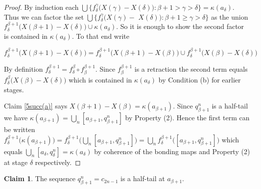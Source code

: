 \documentclass[12pt]{article}
\theoremstyle{plain}
\theoremstyle{definition}
\newcounter{claim5counter}
\newtheorem{claim5}[claim5counter]{Claim}
\newcommand{\K}{\ensuremath{\kappa}}
\newcommand{\B}{\ensuremath{\beta}}
\newcommand{\G}{\ensuremath{\gamma}}
\newcommand{\D}{\ensuremath{\delta}}
\newcommand{\0}{\ensuremath{\varnothing}}
\begin{document}
	\begin{proof}
		
		
		By induction each $\bigcup \big \{f^\G_\D  \big (X(\G) - X(\D) \big ): \B+1 > \G > \D \big \} = \K(a_\D)$.
		Thus we can factor the set $\bigcup \big \{f^\G_\D  \big (X(\G) - $ $X(\D) \big ): \B + 1 \ge \G > \D \big \}$ as the union $f^{\B+1}_\D  \big (X(\B+1) - X(\D) \big ) \cup \K(a_\D)$. So it is enough to show the second factor is contained in $ \K(a_\D) $. To that end write
		
		
		
		\begin{center}
			
			$f^{\B+1}_\D  \big (X(\B+1) - X(\D) \big ) = f^{\B+1}_\D  \big (X(\B+1) - X(\B) \big ) \cup f^{\B+1}_\D  \big (X(\B) - X(\D) \big )$	
			
		\end{center}
		
		By definition $f^{\B+1}_\D = f^\B_\D \circ f^{\B+1}_\B$. Since $f^{\B+1}_\B$ is a retraction the second term equals $f^{\B}_\D  \big (X(\B) - X(\D) \big )$ which is contained in $\K(a_\D)$ by Condition (b) for earlier stages.
		
		Claim \ref{5succ(a)} says $X(\B+1) - X(\B) = \K(a_{\B+1})$. Since $q^n_{\B+1}$ is a half-tail we have $\K(a_{\B+1}) = \bigcup _n [a_{\B+1},q^n_{\B+1}]$ by Property (2). Hence the first term can be written
		$f^{\B+1}_\D \big (\K(a_{\B+1}) \big ) = f^{\B+1}_\D \big ( \bigcup_n[a_{\B+1}, q^n_{\B+1}] \big ) = \bigcup_n f^{\B+1}_\D \big ( [a_{\B+1}, q^n_{\B+1}] \big )$ which equals $\bigcup_n[a_{\D}, q^n_{\D}] = \K(a_\D)$ by coherence of the bonding maps and Property (2) at stage $\D$ respectively.
	\end{proof}
	
	
	\begin{claim5}
		The sequence $q^n_{\B+1} = c_{2n-1}$ is a half-tail at $a_{\B+1}$.
	\end{claim5}
	
\end{document}
